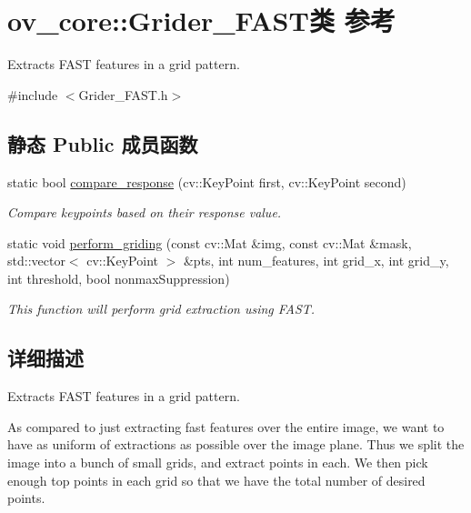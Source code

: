 \hypertarget{classov__core_1_1Grider__FAST}{}\section{ov\+\_\+core\+:\+:Grider\+\_\+\+F\+A\+S\+T类 参考}
\label{classov__core_1_1Grider__FAST}


Extracts F\+A\+ST features in a grid pattern.  




{\ttfamily \#include $<$Grider\+\_\+\+F\+A\+S\+T.\+h$>$}

\subsection*{静态 Public 成员函数}
\begin{DoxyCompactItemize}
\item 
static bool \hyperlink{classov__core_1_1Grider__FAST_a62a844fcba586eb31998ecf467634d6e}{compare\+\_\+response} (cv\+::\+Key\+Point first, cv\+::\+Key\+Point second)
\begin{DoxyCompactList}\small\item\em Compare keypoints based on their response value. \end{DoxyCompactList}\item 
static void \hyperlink{classov__core_1_1Grider__FAST_a36acfad18dc36878776dd4fa21165eac}{perform\+\_\+griding} (const cv\+::\+Mat \&img, const cv\+::\+Mat \&mask, std\+::vector$<$ cv\+::\+Key\+Point $>$ \&pts, int num\+\_\+features, int grid\+\_\+x, int grid\+\_\+y, int threshold, bool nonmax\+Suppression)
\begin{DoxyCompactList}\small\item\em This function will perform grid extraction using F\+A\+ST. \end{DoxyCompactList}\end{DoxyCompactItemize}


\subsection{详细描述}
Extracts F\+A\+ST features in a grid pattern. 

As compared to just extracting fast features over the entire image, we want to have as uniform of extractions as possible over the image plane. Thus we split the image into a bunch of small grids, and extract points in each. We then pick enough top points in each grid so that we have the total number of desired points. 

